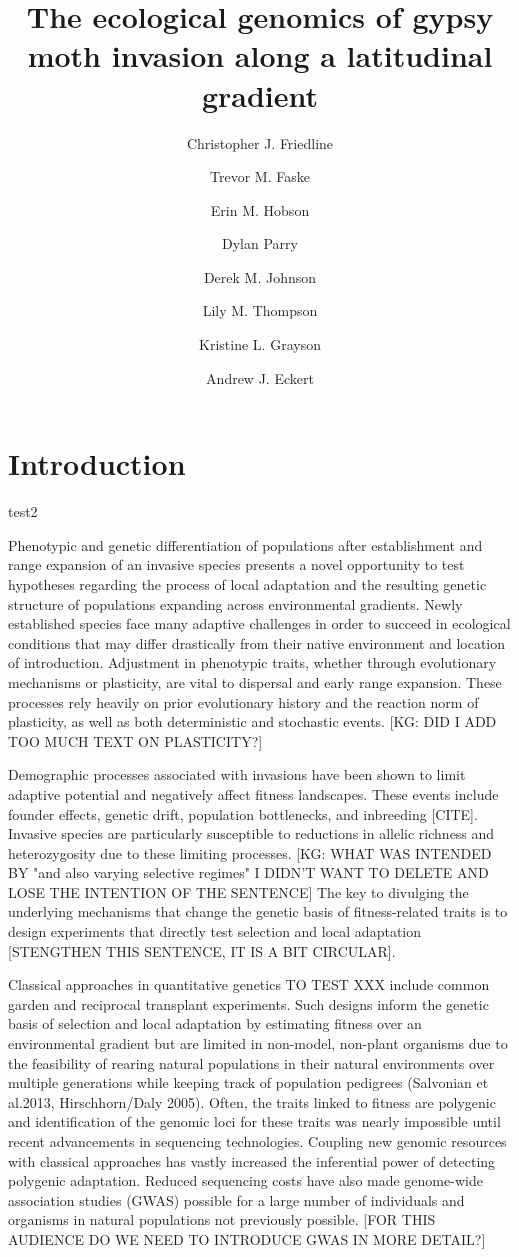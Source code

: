 \documentclass[fleqn,11pt]{wlpeerj}
\title{The ecological genomics of gypsy moth invasion along a latitudinal
gradient}
\author[1]{Christopher J. Friedline}
\author[1]{Trevor M. Faske}
\author[1]{Erin M. Hobson}
\author[2]{Dylan Parry}
\author[1]{Derek M. Johnson}
\author[3]{Lily M. Thompson}
\author[3,*]{Kristine L. Grayson}
\author[1,*,\textdagger]{Andrew J. Eckert}
\affil[1]{Department of Biology, Virginia Commonwealth University}
\affil[2]{College of Environmental Science and Forestry, State University of
New York}
\affil[3]{Department of Biology, University of Richmond}
\affil[*]{Authors contributed equally}
\affil[ \textdagger]{Corresponding author}
\begin{document}
\flushbottom
\maketitle
\thispagestyle{empty}

\linenumbers%

\section*{Introduction}

test2

Phenotypic and genetic differentiation of populations after establishment and range expansion of an invasive species presents a novel opportunity to test hypotheses regarding the process of local adaptation and the resulting genetic structure of populations expanding across environmental gradients. Newly established species face many adaptive challenges in order to succeed in ecological conditions that may differ drastically from their native environment and location of introduction. Adjustment in phenotypic traits, whether through evolutionary mechanisms or plasticity, are vital to dispersal and early range expansion. These processes rely heavily on prior evolutionary history and the reaction norm of plasticity, as well as both deterministic and stochastic events. [KG: DID I ADD TOO MUCH TEXT ON PLASTICITY?]
 
Demographic processes associated with invasions have been shown to limit adaptive potential and negatively affect fitness landscapes. These events include founder effects, genetic drift, population bottlenecks, and inbreeding [CITE].  Invasive species are particularly susceptible to reductions in allelic richness and heterozygosity due to these limiting processes. [KG: WHAT WAS INTENDED BY "and also varying selective regimes" I DIDN'T WANT TO DELETE AND LOSE THE INTENTION OF THE SENTENCE]  The key to divulging the underlying mechanisms that change the genetic basis of fitness-related traits is to design experiments that directly test selection and local adaptation [STENGTHEN THIS SENTENCE, IT IS A BIT CIRCULAR].
 
Classical approaches in quantitative genetics TO TEST XXX include common garden and reciprocal transplant experiments. Such designs inform the genetic basis of selection and local adaptation by estimating fitness over an environmental gradient but are limited in non-model, non-plant organisms due to the feasibility of rearing natural populations in their natural environments over multiple generations while keeping track of population pedigrees (Salvonian et al.2013, Hirschhorn/Daly 2005). Often, the traits linked to fitness are polygenic and identification of the genomic loci for these traits was nearly impossible until recent advancements in sequencing technologies. Coupling new genomic resources with classical approaches has vastly increased the inferential power of detecting polygenic adaptation. Reduced sequencing costs have also made genome-wide association studies (GWAS) possible for a large number of individuals and organisms in natural populations not previously possible. [FOR THIS AUDIENCE DO WE NEED TO INTRODUCE GWAS IN MORE DETAIL?]
\end{document}

